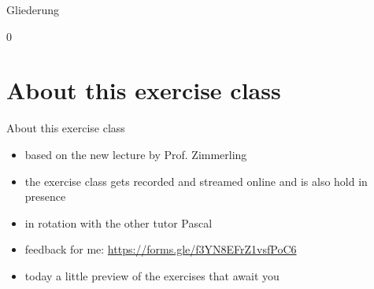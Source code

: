 \def\pascal{0}
\def\preview{1}









\begin{withoutheadline}
  \begin{withoutfootline}
    \begin{frame}
      \titlepagesecond
    \end{frame}
  \end{withoutfootline}

  \begin{frame}{Gliederung}
    \tableofcontents[hideallsubsections]
  \end{frame}
\end{withoutheadline}

\if\pascal0{
\section{About this exercise class}

\begin{frame}{About this exercise class}{}
  \begin{itemize}
    \item based on the \alert{new} lecture by Prof. Zimmerling
    \item the exercise class gets \alert{recorded} and \alert{streamed online} and is also hold in \alert{presence}
    \item in \alert{rotation} with the other tutor \alert{Pascal}
    \item \alert{feedback for me:} \url{https://forms.gle/f3YN8EFrZ1vsfPoC6}
    \item today a little \alert{preview} of the exercises that await you
  \end{itemize}
\end{frame}
}
\fi






